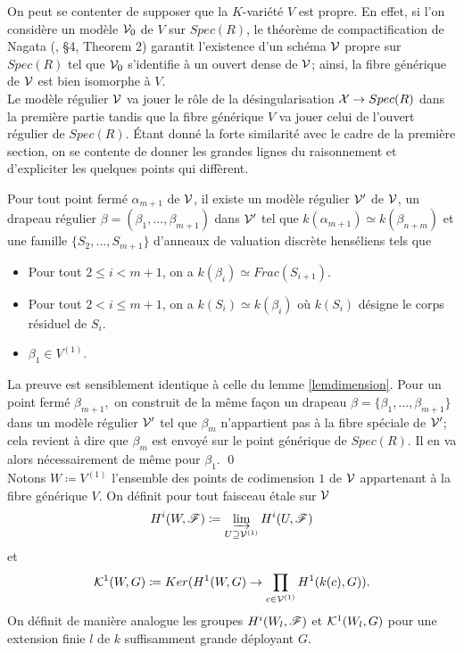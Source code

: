 \documentclass[11pt]{article}
\begin{document}
\rmke On peut se contenter de supposer que la $K$-variété $V$ est propre. En effet, si l'on considère un modèle $\mathcal{V}_0$ de $V$ sur $Spec(R)$, le théorème de compactification de Nagata (\cite{Nagata}, §4, Theorem 2) garantit l'existence d'un schéma $\mathcal{V}$ propre sur $Spec(R)$ tel que $\mathcal{V}_0$ s'identifie à un ouvert dense de $\mathcal{V}$; ainsi, la fibre générique de $\mathcal{V}$ est bien isomorphe à $V$.\\

Le modèle régulier $\mathcal{V}$ va jouer le rôle de la désingularisation $\mathcal{X} \rightarrow Spec(R)$ dans la première partie tandis que la fibre générique $V$ va jouer celui de l'ouvert régulier de $Spec(R)$. Étant donné la forte similarité avec le cadre de la première section, on se contente de donner les grandes lignes du raisonnement et d'expliciter les quelques points qui diffèrent.

\begin{lemme}
Pour tout point fermé $\alpha_{m+1}$ de $\mathcal{V}$, il existe un modèle régulier $\mathcal{V}'$ de $\mathcal{V}$, un drapeau régulier $\beta = (\beta_{1},...,\beta_{m+1})$ dans $\mathcal{V}'$ tel que $k(\alpha_{m+1}) \simeq k(\beta_{n+m})$ et une famille $\{S_2,...,S_{m+1}\}$ d'anneaux de valuation discrète henséliens tels que 
\begin{itemize}
    \item Pour tout $2\leq i < m+1$, on a  $k(\beta_i) \simeq Frac(S_{i+1})$.
    \item  Pour tout $2 < i \leq m+1$, on a $k(S_i) \simeq k(\beta_i)$ où $k(S_i)$ désigne le corps résiduel de $S_i$.
    \item $\beta_1 \in V^{(1)}$.
\end{itemize}
\end{lemme}

\proof La preuve est sensiblement identique à celle du lemme \ref{lemdimension}. Pour un point fermé $\beta_{m+1},$ on construit de la même façon un drapeau $\beta = \{\beta_{1},...,\beta_{m+1}\}$ dans un modèle régulier $\mathcal{V}'$ tel que $\beta_m$ n'appartient pas à la fibre spéciale de $\mathcal{V}'$; cela revient à dire que $\beta_m$ est envoyé sur le point générique de $Spec(R)$. Il en va alors nécessairement de même pour $\beta_1.$ \qed \\

Notons $W \coloneqq V^{(1)}$ l'ensemble des points de codimension $1$ de $\mathcal{V}$ appartenant à la fibre générique $V$. On définit pour tout faisceau étale sur $\mathcal{V}$
$$
H^i(W, \sF) \coloneqq \drl_{U \supseteq \CV^{(1)}} H^i(U,\sF)
$$
et
$$
\CK^1(W,G) \coloneqq Ker(H^1(W,G) \ra \prod_{c \in \CV^{(1)}} H^1(k(c), G)).
$$
On définit de manière analogue les groupes $H^i(W_l, \mathscr{F})$ et $\mathcal{K}^1(W_l,G)$ pour une extension finie $l$ de $k$ suffisamment grande déployant $G$.
\end{document}
